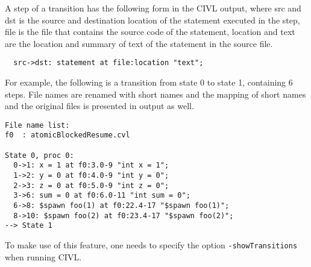 A step of a transition has the following form in the CIVL output,
where src and dst is the source and destination location of the
statement executed in the step, file is the file that contains the
source code of the statement, location and text are the location and
summary of text of the statement in the source file.

\begin{verbatim}
  src->dst: statement at file:location "text";
\end{verbatim}

For example, the following is a transition from state 0 to state 1,
containing 6 steps. File names are renamed with short names and the
mapping of short names and the original files is presented in output
as well.

\begin{verbatim}
File name list:
f0	: atomicBlockedResume.cvl

State 0, proc 0: 
  0->1: x = 1 at f0:3.0-9 "int x = 1";
  1->2: y = 0 at f0:4.0-9 "int y = 0";
  2->3: z = 0 at f0:5.0-9 "int z = 0";
  3->6: sum = 0 at f0:6.0-11 "int sum = 0";
  6->8: $spawn foo(1) at f0:22.4-17 "$spawn foo(1)";
  8->10: $spawn foo(2) at f0:23.4-17 "$spawn foo(2)";
--> State 1
\end{verbatim}

To make use of this feature, one needs to specify the option
\texttt{-showTransitions} when running CIVL.

